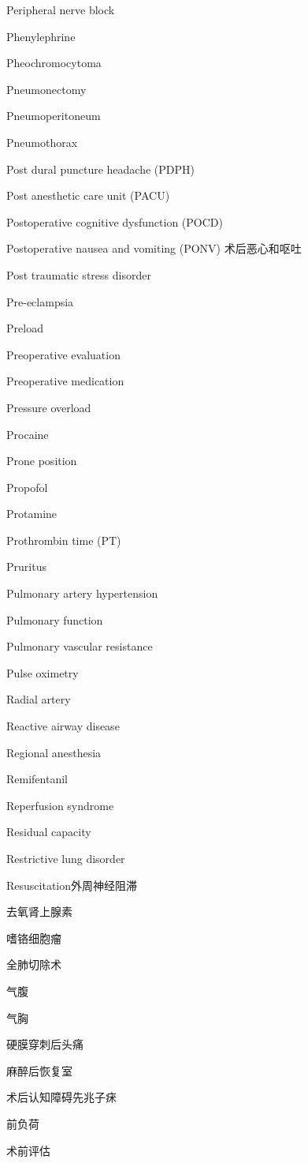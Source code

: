 \documentclass[10pt]{article}
\begin{document}
Peripheral nerve block

Phenylephrine

Pheochromocytoma

Pneumonectomy

Pneumoperitoneum

Pneumothorax

Post dural puncture headache (PDPH)

Post anesthetic care unit (PACU)

Postoperative cognitive dysfunction (POCD)

Postoperative nausea and vomiting (PONV) 术后恶心和呕吐

Post traumatic stress disorder

Pre-eclampsia

Preload

Preoperative evaluation

Preoperative medication

Pressure overload

Procaine

Prone position

Propofol

Protamine

Prothrombin time (PT)

Pruritus

Pulmonary artery hypertension

Pulmonary function

Pulmonary vascular resistance

Pulse oximetry

Radial artery

Reactive airway disease

Regional anesthesia

Remifentanil

Reperfusion syndrome

Residual capacity

Restrictive lung disorder

Resuscitation外周神经阻滞

去氧肾上腺素

嗜铬细胞瘤

全肺切除术

气腹

气胸

硬膜穿刺后头痛

麻醉后恢复室

术后认知障碍先兆子㾁

前负荷

术前评估
\end{document}
